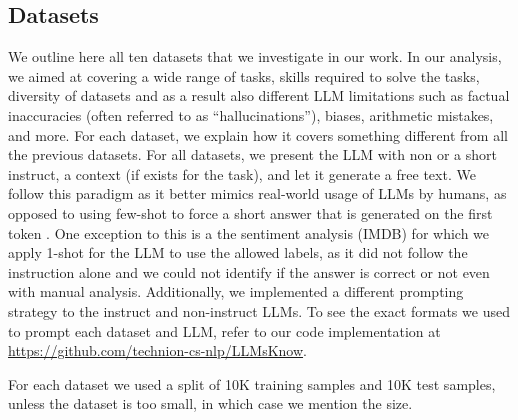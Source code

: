 \documentclass{article} %
\newcommand{\repo}{\url{https://github.com/technion-cs-nlp/LLMsKnow}}
\begin{document}


\subsection{Datasets}
\label{app:datasets}

We outline here all ten datasets that we investigate in our work.
In our analysis, we aimed at covering a wide range of tasks, skills required to solve the tasks, diversity of datasets and as a result also different LLM limitations such as factual inaccuracies (often referred to as ``hallucinations''), biases, arithmetic mistakes, and more.
For each dataset, we explain how it covers something different from all the previous datasets.
For all datasets, we present the LLM with non or a short instruct, a context (if exists for the task), and let it generate a free text.
We follow this paradigm as it better mimics real-world usage of LLMs by humans, as opposed to using few-shot to force a short answer that is generated on the first token \citep{yuksekgonul2023attention,chen2024inside,simhi2024constructing}.
One exception to this is a the sentiment analysis (IMDB) for which we apply 1-shot for the LLM to use the allowed labels, as it did not follow the instruction alone and we could not identify if the answer is correct or not even with manual analysis. Additionally, we implemented a different prompting strategy to the instruct and non-instruct LLMs.
To see the exact formats we used to prompt each dataset and LLM, refer to our code implementation at \repo.

For each dataset we used a split of 10K training samples and 10K test samples, unless the dataset is too small, in which case we mention the size.
\end{document}
